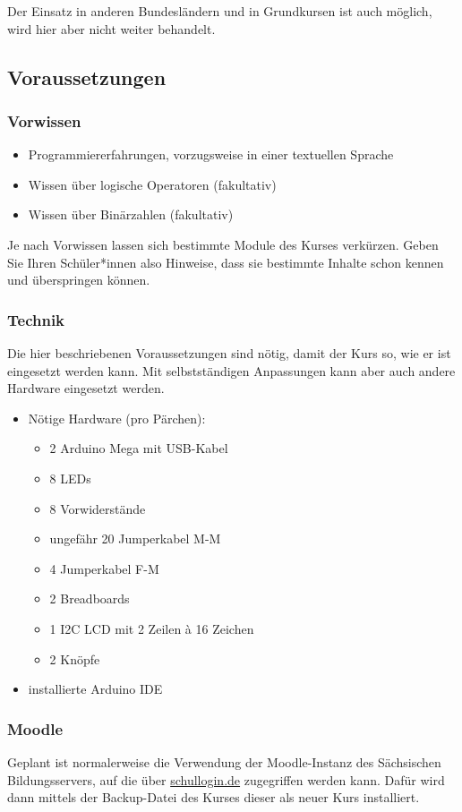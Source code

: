 \documentclass[a4paper]{article}
\begin{document}
Der Einsatz in anderen Bundesländern und in Grundkursen ist auch möglich, wird hier aber nicht weiter behandelt.

\subsection{Voraussetzungen}
\subsubsection{Vorwissen}
\begin{itemize}
    \item Programmiererfahrungen, vorzugsweise in einer textuellen Sprache
    \item Wissen über logische Operatoren (fakultativ)
    \item Wissen über Binärzahlen (fakultativ)
\end{itemize}

Je nach Vorwissen lassen sich bestimmte Module des Kurses verkürzen. Geben Sie Ihren Schüler*innen also Hinweise, dass sie bestimmte Inhalte schon kennen und überspringen können.

\subsubsection{Technik}
Die hier beschriebenen Voraussetzungen sind nötig, damit der Kurs so, wie er ist eingesetzt werden kann. Mit selbstständigen Anpassungen kann aber auch andere Hardware eingesetzt werden.
\begin{itemize}
    \item Nötige Hardware (pro Pärchen):
    \begin{itemize}
        \item 2 Arduino Mega mit USB-Kabel
        \item 8 LEDs
        \item 8 Vorwiderstände
        \item ungefähr 20 Jumperkabel M-M
        \item 4 Jumperkabel F-M
        \item 2 Breadboards
        \item 1 I2C LCD mit 2 Zeilen à 16 Zeichen
        \item 2 Knöpfe
    \end{itemize}
    \item installierte Arduino IDE
\end{itemize}

\subsubsection{Moodle}
Geplant ist normalerweise die Verwendung der Moodle-Instanz des Sächsischen Bildungsservers, auf die über \url{schullogin.de} zugegriffen werden kann. Dafür wird dann mittels der Backup-Datei des Kurses dieser als neuer Kurs installiert.
\end{document}
